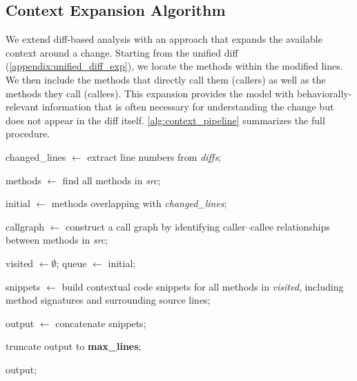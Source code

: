 \documentclass[authoryear,final,5p,times,twocolumn]{elsarticle}
\theoremstyle{plain}
\begin{document}
\subsection{Context Expansion Algorithm}
\label{sec:subset_motivation_retrieval}

We extend diff-based analysis with an approach that expands the available
context around a change. Starting from the unified diff (\ref{appendix:unified_diff_exp}), we locate the methods within the modified lines. We then include the methods that directly call them (callers) as well as the methods they call (callees). This expansion provides the model with behaviorally-relevant information that is often necessary for understanding the change but does not appear in the diff itself. \autoref{alg:context_pipeline} summarizes the full procedure. 

\begin{footnotesize}
\begin{algorithm}[t]
\caption{ContextExpansion(diffs, src, depth, max\_lines)}
\label{alg:context_pipeline}


changed\_lines $\gets$ extract line numbers from \textit{diffs}$;$

methods $\gets$ find all methods in \textit{src}$;$

initial $\gets$ methods overlapping with \textit{changed\_lines}$;$

callgraph $\gets$ construct a call graph by identifying caller--callee relationships between methods in \textit{src}$;$

visited $\gets \emptyset$; queue $\gets$ initial$;$


snippets $\gets$ build contextual code snippets for all methods in \textit{visited},
including method signatures and surrounding source lines$;$

output $\gets$ concatenate snippets$;$

truncate output to \textbf{max\_lines}$;$

\Return output$;$

\end{algorithm}
\end{footnotesize}
\end{document}
